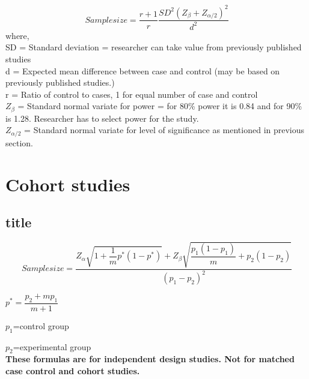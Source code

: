 \documentclass[12pt]{article}
\begin{document}
\begin{equation}
Sample size=\dfrac{r+1}{r}\dfrac{SD^2(Z_\beta+Z_{\alpha/2})^2}{d^2}
\end{equation}
where,\\
SD = Standard deviation = researcher can take value 
from previously published studies\\
d  =  Expected  mean  difference  between  case  and  
control (may be based on previously published studies.)\\
r = Ratio  of  control  to  cases,  1  for  equal  number  of  
case and control\\
$Z_\beta$ =  Standard  normal  variate  for  power  =  for  80\%  
power it is 0.84 and for 90\% is 1.28. Researcher 
has to select power for the study.\\
$Z_{\alpha/2}$ = Standard normal variate for level of significance 
as mentioned in previous section.


\section{Cohort studies}


\subsection{title}


\begin{equation}
Sample size=\dfrac{Z_\alpha\sqrt{1+\dfrac{1}{m}p^*(1-p^*)}+Z_\beta\sqrt{\dfrac{p_1(1-p_1)}{m}+p_2(1-p_2)}}{(p_1-p_2)^2}
\end{equation}

$p^*=\dfrac{p_2+mp_1}{m+1}$

$p_1$=control group

$p_2$=experimental group\\



\textbf{\large These formulas are for independent design studies. Not for matched case control and cohort studies.}
	
	
	
	
	
	
	
	
	
\end{document}
